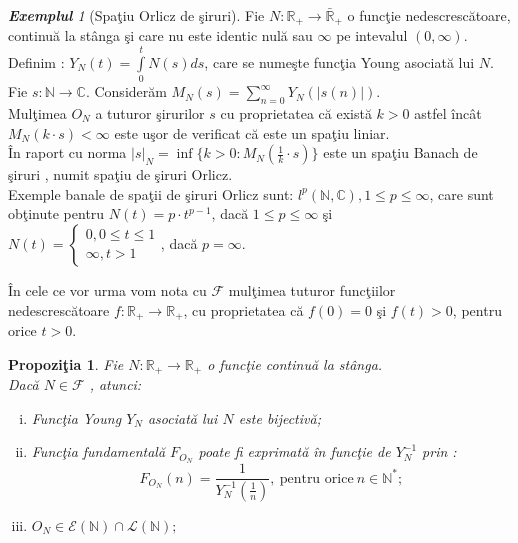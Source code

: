 \documentclass[ a4paper, 12pt]{report}
\newtheorem{prop}[theorem]{\bf Propozi\c tia }
\theoremstyle{definition}
\theoremstyle{remark}
\newtheorem{exemple}{\bf Exemplul}[section]
\numberwithin{equation}{section}
\begin{document}
\begin{exemple}[Spa\c tiu Orlicz de \c siruri]
Fie $N : \mathbb{R}_{+} \rightarrow \bar{\mathbb{R}}_{+}$ o func\c tie nedescresc\u atoare, continu\u a la st\^anga \c si care nu este identic nul\u a sau $\infty$ pe intevalul $(0,\infty)$.
 Definim : $ Y_N (t) = \int\limits_{0}^{t} N(s) ds$, care se nume\c ste func\c tia Young asociat\u a lui $N$.\\
Fie $s : \mathbb{N} \rightarrow \mathbb{C}$. 
Consider\u am $M_N (s)= \sum\limits_{n=0}^{\infty} Y_N(\lvert s(n) \rvert).$\\
Mul\c timea $O_N$ a tuturor \c sirurilor $s$ cu proprietatea c\u a exist\u a $k > 0$ astfel \^inc\^at $M_N(k \cdot s)< \infty$ este u\c sor de verificat c\u a este un spa\c tiu liniar.\\ \^In raport cu norma $\lvert s \rvert_N = \inf\{ k>0: M_N(\frac{1}{k} \cdot s) \}$ este un spa\c tiu Banach de \c siruri , numit spa\c tiu de \c siruri Orlicz.\\
Exemple banale de spa\c tii de \c siruri Orlicz sunt: $l^{p}(\mathbb{N},\mathbb{C}), 1 \leq p \leq \infty$, care sunt ob\c tinute pentru $N(t) = p \cdot t^{p-1}$, dac\u a $1 \leq p \leq \infty$ \c si\\ $N(t) = \begin{cases}
0, 0 \leq t \leq 1\\
\infty, t > 1
\end{cases}$, dac\u a $p =\infty$. 
\end{exemple}
\^In cele ce vor urma vom nota cu $\mathcal{F}$ mul\c timea tuturor func\c tiilor \\
nedescresc\u atoare $f : \mathbb{R}_{+} \rightarrow \mathbb{R}_{+}$, cu proprietatea c\u a $f(0) = 0$ \c si  $f(t) > 0$, pentru orice $t > 0$.
\begin{prop}
Fie $N : \mathbb{R}_{+} \rightarrow \mathbb{R}_{+}$ o func\c tie continu\u a la st\^anga.\\
 Dac\u a $N \in \mathcal{F}$ , atunci:
\begin{enumerate}[(i)]
\item Func\c tia Young $Y_N$ asociat\u a lui $N$ este bijectiv\u a;
\item Func\c tia fundamental\u a $F_{O_{N}}$ poate fi exprimat\u a \^in func\c tie de $Y_N^{-1}$ prin :
\[ F_{O_{N}} (n) = \frac{1}{Y_{N}^{-1}(\frac{1}{n})},\ \mbox{pentru orice}\ n \in \mathbb{N}^{\ast};\]
\item $O_N \in \mathcal{E}(\mathbb{N}) \cap \mathcal{L}(\mathbb{N});$
\end{enumerate} 
\end{prop}
\end{document}

